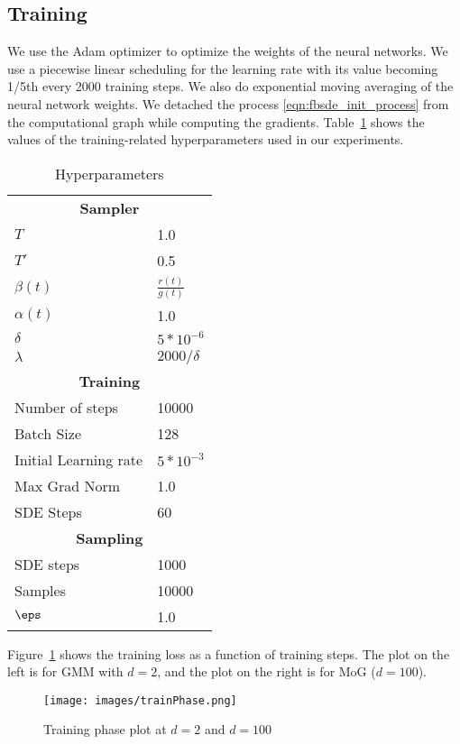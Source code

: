 \subsection{Training}
We use the Adam optimizer \cite{kingma_adam_2017} to optimize the weights of the neural networks. We use a piecewise linear scheduling for the learning rate with its value becoming 1/5th every 2000 training steps. We also do exponential moving averaging of the neural network weights. We detached the process \ref{eqn:fbsde_init_process} from the computational graph while computing the gradients. Table~\ref{tab:hyperparams} shows the values of the training-related hyperparameters used in our experiments.

\begin{table}
  \caption{Hyperparameters}
  \label{tab:hyperparams}
  \centering
  \begin{tabular}{ll}
    \toprule
    \multicolumn{2}{c}{\textbf{Sampler}} \\
    $T$ & 1.0\\
    $T'$ & 0.5\\
    $\beta(t)$ & $\frac{r(t)}{g(t)}$\\
    $\alpha(t)$ & 1.0\\
    $\delta$ & $5*10^{-6}$\\
    $\lambda$ & $2000/\delta$\\
    \midrule
    \multicolumn{2}{c}{\textbf{Training}}\\
    Number of steps & 10000\\
    Batch Size & 128\\
    Initial Learning rate     & $5*10^{-3}$\\
    Max Grad Norm   & 1.0\\
    SDE Steps & 60\\
    \midrule
    \multicolumn{2}{c}{\textbf{Sampling}}\\
    SDE steps & 1000\\
    Samples & 10000\\
    $\eps$ & 1.0\\
    \bottomrule
  \end{tabular}
\end{table}
Figure~\ref{fig:trainphase} shows the training loss as a function of training steps. The plot on the left is for GMM with $d=2$, and the plot on the right is for MoG ($d=100$).
\begin{figure}[!htb]
    \centering
        \texttt{[image: images/trainPhase.png]}
        \caption{Training phase plot at $d=2$ and $d=100$}
        \label{fig:trainphase}
\end{figure}

